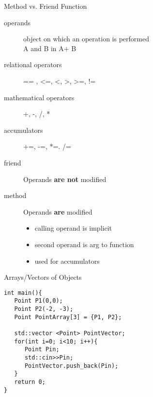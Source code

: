\documentclass[xcolor={dvipsnames}]{beamer}
\begin{document}
\begin{frame}{Method vs. Friend Function}
	\begin{description}
		\item[operands] object on which an operation is performed\\A and B in A+ B
		\item[relational operators] == , \textless=, \textless, \textgreater, \textgreater=, !=
		\item[mathematical operators] +, -, /, *
		\item[accumulators] +=, -=, *=. /=
		\item[friend] Operands \textbf{are not} modified
		\item[method] Operands \textbf{are} modified
			\begin{itemize}
				\item calling operand is implicit
				\item second operand is arg to function
				\item used for accumulators
			\end{itemize}
		
			
	\end{description}
\end{frame}

\begin{frame}[fragile]{Arrays/Vectors of Objects}
\begin{verbatim}
int main(){
   Point P1(0,0);
   Point P2(-2, -3);
   Point PointArray[3] = {P1, P2};

   std::vector <Point> PointVector;
   for(int i=0; i<10; i++){
      Point Pin;
      std::cin>>Pin;
      PointVector.push_back(Pin);
   }
   return 0;
}
\end{verbatim}
\end{frame}
\end{document}

